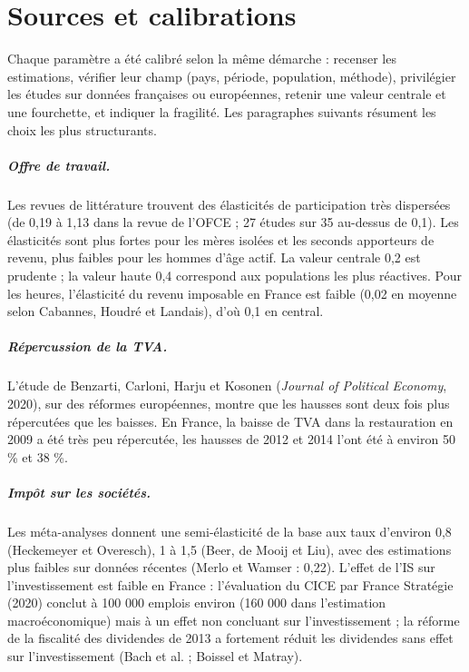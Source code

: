 \chapter{Sources et calibrations}\label{ch:sources}

Chaque paramètre a été calibré selon la même démarche : recenser les estimations, vérifier leur champ (pays,
période, population, méthode), privilégier les études sur données françaises ou européennes, retenir une valeur
centrale et une fourchette, et indiquer la fragilité. Les paragraphes suivants résument les choix les plus
structurants.

\paragraph{Offre de travail.} Les revues de littérature trouvent des élasticités de participation très dispersées
(de 0,19 à 1,13 dans la revue de l'OFCE ; 27 études sur 35 au-dessus de 0,1). Les élasticités sont plus fortes pour
les mères isolées et les seconds apporteurs de revenu, plus faibles pour les hommes d'âge actif. La valeur centrale
0,2 est prudente ; la valeur haute 0,4 correspond aux populations les plus réactives. Pour les heures, l'élasticité
du revenu imposable en France est faible (0,02 en moyenne selon Cabannes, Houdré et Landais), d'où 0,1 en central.

\paragraph{Répercussion de la TVA.} L'étude de Benzarti, Carloni, Harju et Kosonen (\emph{Journal of Political
Economy}, 2020), sur des réformes européennes, montre que les hausses sont deux fois plus répercutées que les
baisses. En France, la baisse de TVA dans la restauration en 2009 a été très peu répercutée, les hausses de 2012 et
2014 l'ont été à environ 50 \% et 38 \%.

\paragraph{Impôt sur les sociétés.} Les méta-analyses donnent une semi-élasticité de la base aux taux d'environ 0,8
(Heckemeyer et Overesch), 1 à 1,5 (Beer, de Mooij et Liu), avec des estimations plus faibles sur données récentes
(Merlo et Wamser : 0,22). L'effet de l'IS sur l'investissement est faible en France : l'évaluation du CICE par
France Stratégie (2020) conclut à 100 000 emplois environ (160 000 dans l'estimation macroéconomique) mais à un effet
non concluant sur l'investissement ; la réforme de la fiscalité des dividendes de 2013 a fortement réduit les
dividendes sans effet sur l'investissement (Bach et al. ; Boissel et Matray).

